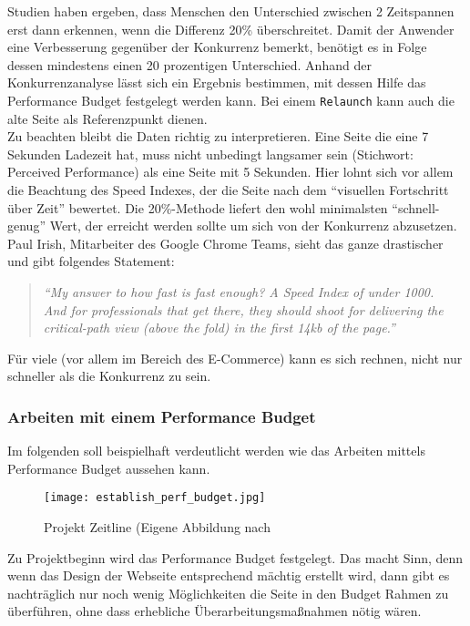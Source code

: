 				Studien haben ergeben, dass Menschen den Unterschied zwischen 2 Zeitspannen erst dann erkennen, wenn die Differenz 20\% überschreitet.\autocite{seow09} Damit der Anwender eine Verbesserung gegenüber der Konkurrenz bemerkt, benötigt es in Folge dessen mindestens einen 20 prozentigen Unterschied. Anhand der Konkurrenzanalyse lässt sich ein Ergebnis bestimmen, mit dessen Hilfe das Performance Budget festgelegt werden kann. Bei einem \texttt{Relaunch} kann auch die alte Seite als Referenzpunkt dienen.\\
				Zu beachten bleibt die Daten richtig zu interpretieren. Eine Seite die eine 7 Sekunden Ladezeit hat, muss nicht unbedingt langsamer sein (Stichwort: Perceived Performance) als eine Seite mit 5 Sekunden. Hier lohnt sich vor allem die Beachtung des Speed Indexes, der die Seite nach dem "`visuellen Fortschritt über Zeit"' bewertet. Die 20\%-Methode liefert den wohl minimalsten "`schnell-genug"' Wert, der erreicht werden sollte um sich von der Konkurrenz abzusetzen.\\
				Paul Irish, Mitarbeiter des Google Chrome Teams, sieht das ganze drastischer und gibt folgendes Statement:
				\begin{quote}
					\textit{"`My answer to how fast is fast enough? A Speed Index of under 1000.\\
					And for professionals that get there, they should shoot for delivering the critical-path view (above the fold) in the first 14kb of the page."'} \autocite{irish14}
				\end{quote}
				Für viele (vor allem im Bereich des E-Commerce) kann es sich rechnen, nicht nur schneller als die Konkurrenz zu sein.

		\subsubsection{Arbeiten mit einem Performance Budget} %
		\label{ssub:arbeiten_mit_einem_performance_budget}
			Im folgenden soll beispielhaft verdeutlicht werden wie das Arbeiten mittels Performance Budget aussehen kann. 

			\begin{figure}[htbp]
				\begin{center}
					\texttt{[image: establish\_perf\_budget.jpg]}
					\caption{Projekt Zeitline (Eigene Abbildung nach \autocite[p. 58]{kovalcin15}}
					\label{fig:establish_perf_budget}
				\end{center}
			\end{figure}
			Zu Projektbeginn wird das Performance Budget festgelegt. Das macht Sinn, denn wenn das Design der Webseite entsprechend mächtig erstellt wird, dann gibt es nachträglich nur noch wenig Möglichkeiten die Seite in den Budget Rahmen zu überführen, ohne dass erhebliche Überarbeitungsmaßnahmen nötig wären.\\

